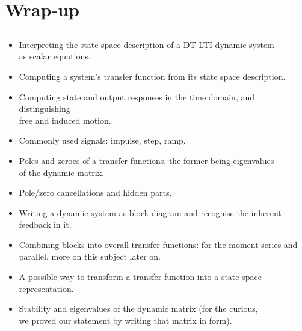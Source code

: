 \section{Wrap-up}
\subsection{}

\begin{frame}
 \begin{itemize}[<+-| alert@+>]
 \item Interpreting the state space description of a DT LTI dynamic system\\
       as scalar equations.
 \item Computing a system's transfer function from its state space description.
 \item Computing state and output responses in the time domain, and distinguishing\\
       free and induced motion.
 \item Commonly used signals: impulse, step, ramp.
 \end{itemize}
\end{frame}

\begin{frame}
 \begin{itemize}[<+-| alert@+>]
 \item Poles and zeroes of a transfer functions, the former being eigenvalues\\
       of the dynamic matrix.
 \item Pole/zero cancellations and hidden parts.
 \item Writing a dynamic system as block diagram and recognise the inherent\\
       feedback in it.
 \item Combining blocks into overall transfer functions: for the moment series and parallel, more
       on this subject later on.
 \item A possible way to transform a transfer function into a state space\\
       representation.
 \item Stability and eigenvalues of the dynamic matrix (for the curious,\\
       we proved our statement by writing that matrix in  form).
 \end{itemize}
\end{frame}

